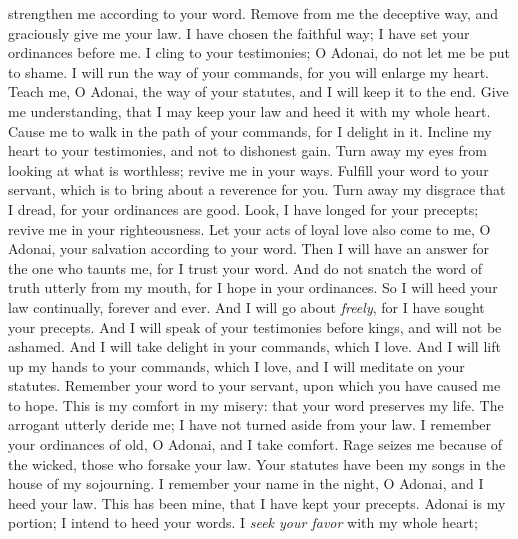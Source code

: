 \begin{biblechapter}
strengthen me according to your word.
\verse Remove from me the deceptive way, 
and graciously give me your law.
\verse I have chosen the faithful way; 
I have set your ordinances before me.
\verse I cling to your testimonies; 
O Adonai, do not let me be put to shame.
\verse I will run the way of your commands, 
for you will enlarge my heart.
 Teach me, O Adonai, the way of your statutes, 
and I will keep it to the end.
\verse Give me understanding, that I may keep your law 
and heed it with my whole heart.
\verse Cause me to walk in the path of your commands, 
for I delight in it.
\verse Incline my heart to your testimonies, 
and not to dishonest gain.
\verse Turn away my eyes from looking at what is worthless; 
revive me in your ways.
\verse Fulfill your word to your servant, 
which is to bring about a reverence for you.
\verse Turn away my disgrace that I dread, 
for your ordinances are good.
\verse Look, I have longed for your precepts; 
revive me in your righteousness.
 Let your acts of loyal love also come to me, O Adonai, 
your salvation according to your word.
\verse Then I will have an answer for the one who taunts me, 
for I trust your word.
\verse And do not snatch the word of truth utterly from my mouth, 
for I hope in your ordinances.
\verse So I will heed your law continually, 
forever and ever.
\verse And I will go about \textit{freely}, 
for I have sought your precepts.
\verse And I will speak of your testimonies before kings, 
and will not be ashamed.
\verse And I will take delight in your commands, 
which I love.
\verse And I will lift up my hands to your commands, which I love, 
and I will meditate on your statutes.
 Remember your word to your servant, 
upon which you have caused me to hope.
\verse This is my comfort in my misery: 
that your word preserves my life.
\verse The arrogant utterly deride me; 
I have not turned aside from your law.
\verse I remember your ordinances of old, O Adonai, 
and I take comfort.
\verse Rage seizes me because of the wicked, 
those who forsake your law.
\verse Your statutes have been my songs 
in the house of my sojourning.
\verse I remember your name in the night, O Adonai, 
and I heed your law.
\verse This has been mine, 
that I have kept your precepts.
 Adonai is my portion; 
I intend to heed your words.
\verse I \textit{seek your favor} with my whole heart; 

\end{biblechapter}
